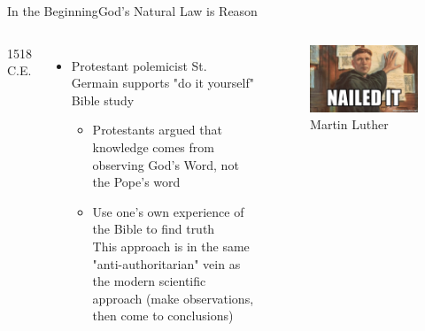 \begin{frame}{In the Beginning}{God's Natural Law is Reason}
	\begin{columns}[T]
			1518 C.E.
			\begin{itemize}
				\item Protestant polemicist St. Germain supports "do it yourself" Bible study
					\begin{itemize}
						\item Protestants argued that knowledge comes from observing God's Word, not the Pope's word
						\item Use one's own experience of the Bible to find truth\\
							This approach is in the same "anti-authoritarian" vein as the modern scientific approach (make observations, then come to conclusions)
					\end{itemize}
			\end{itemize}
			\begin{figure}
				\centering
				\includegraphics[width=\textwidth]{images/martin_luther}
				\caption{Martin Luther}
			\end{figure}
	\end{columns}
\end{frame}


